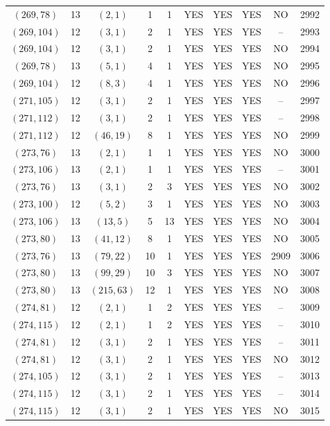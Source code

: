 \begin{longtable}{|c|c|c|c|c|c|c|c|c|c|}
$(269, 78)$ & 13 & $(2, 1)$ & 1 & 1 & YES & YES & YES & NO & 2992\\
$(269, 104)$ & 12 & $(3, 1)$ & 2 & 1 & YES & YES & YES & -- & 2993\\
$(269, 104)$ & 12 & $(3, 1)$ & 2 & 1 & YES & YES & YES & NO & 2994\\
$(269, 78)$ & 13 & $(5, 1)$ & 4 & 1 & YES & YES & YES & NO & 2995\\
$(269, 104)$ & 12 & $(8, 3)$ & 4 & 1 & YES & YES & YES & NO & 2996\\
$(271, 105)$ & 12 & $(3, 1)$ & 2 & 1 & YES & YES & YES & -- & 2997\\
$(271, 112)$ & 12 & $(3, 1)$ & 2 & 1 & YES & YES & YES & -- & 2998\\
$(271, 112)$ & 12 & $(46, 19)$ & 8 & 1 & YES & YES & YES & NO & 2999\\
$(273, 76)$ & 13 & $(2, 1)$ & 1 & 1 & YES & YES & YES & NO & 3000\\
$(273, 106)$ & 13 & $(2, 1)$ & 1 & 1 & YES & YES & YES & -- & 3001\\
$(273, 76)$ & 13 & $(3, 1)$ & 2 & 3 & YES & YES & YES & NO & 3002\\
$(273, 100)$ & 12 & $(5, 2)$ & 3 & 1 & YES & YES & YES & NO & 3003\\
$(273, 106)$ & 13 & $(13, 5)$ & 5 & 13 & YES & YES & YES & NO & 3004\\
$(273, 80)$ & 13 & $(41, 12)$ & 8 & 1 & YES & YES & YES & NO & 3005\\
$(273, 76)$ & 13 & $(79, 22)$ & 10 & 1 & YES & YES & YES & 2909 & 3006\\
$(273, 80)$ & 13 & $(99, 29)$ & 10 & 3 & YES & YES & YES & NO & 3007\\
$(273, 80)$ & 13 & $(215, 63)$ & 12 & 1 & YES & YES & YES & NO & 3008\\
$(274, 81)$ & 12 & $(2, 1)$ & 1 & 2 & YES & YES & YES & -- & 3009\\
$(274, 115)$ & 12 & $(2, 1)$ & 1 & 2 & YES & YES & YES & -- & 3010\\
$(274, 81)$ & 12 & $(3, 1)$ & 2 & 1 & YES & YES & YES & -- & 3011\\
$(274, 81)$ & 12 & $(3, 1)$ & 2 & 1 & YES & YES & YES & NO & 3012\\
$(274, 105)$ & 12 & $(3, 1)$ & 2 & 1 & YES & YES & YES & -- & 3013\\
$(274, 115)$ & 12 & $(3, 1)$ & 2 & 1 & YES & YES & YES & -- & 3014\\
$(274, 115)$ & 12 & $(3, 1)$ & 2 & 1 & YES & YES & YES & NO & 3015\\

\end{longtable}
